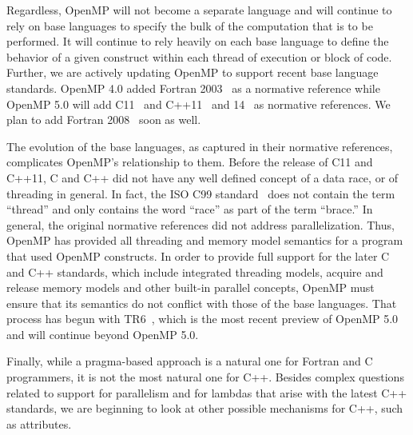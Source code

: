 Regardless, OpenMP will not become a separate language and will 
continue to rely on base languages to specify the bulk of the
computation that is to be performed. It will continue to rely heavily 
on each base language to define the behavior of a given construct 
within each thread of execution or block of code. Further, we are
actively updating OpenMP to support recent base language standards. 
OpenMP 4.0 added Fortran 2003~\cite{F2003} as a normative reference
while OpenMP 5.0 will add C11~\cite{c11} and C++11~\cite{c++11} and
14~\cite{c++14} as normative references. We plan to add Fortran 
2008~\cite{F2008} soon as well.

The evolution of the base languages, as captured in their normative
references, complicates OpenMP's relationship to them. Before the 
release of C11 and C++11, C and C++ did not have any well defined 
concept of a data race, or of threading in general. In fact, the 
ISO C99 standard~\cite{c99} does not contain the term ``thread'' 
and only contains the word ``race'' as part of the term ``brace.''
In general, the original normative references did not address
parallelization. Thus, OpenMP has provided all threading and memory 
model semantics for a program that used OpenMP constructs. In 
order to provide full support for the later C and C++ standards, 
which include integrated threading models, acquire and release 
memory models and other built-in parallel concepts, OpenMP must 
ensure that its semantics do not conflict with those of the base
languages. That process has begun with TR6~\cite{TR6}, which is 
the most recent preview of OpenMP 5.0 and will continue beyond
OpenMP 5.0.

Finally, while a pragma-based approach is a natural one for Fortran
and C programmers, it is not the most natural one for C++. Besides
complex questions related to support for parallelism and for lambdas
that arise with the latest C++ standards, we are beginning to look at
other possible mechanisms for C++, such as attributes.


